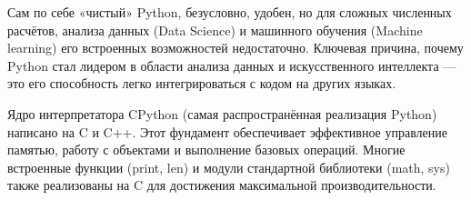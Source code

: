 \documentclass[pract]{SCWorks}
\begin{document}

\date{2026}

\maketitle

\secNumbering

\tableofcontents




\intro


Сам по себе «чистый» Python, безусловно, удобен, но для сложных численных расчётов, анализа данных (Data Science) и 
машинного обучения (Machine learning) его встроенных возможностей недостаточно. Ключевая причина, почему Python стал 
лидером в области анализа данных и искусственного интеллекта — это его способность легко интегрироваться 
с кодом на других языках.

Ядро интерпретатора CPython (самая распространённая реализация Python) написано на C и C++. Этот фундамент обеспечивает 
эффективное управление памятью, работу с объектами и выполнение базовых операций. 
Многие встроенные функции (print, len) и модули стандартной библиотеки (math, sys) также реализованы 
на C для достижения максимальной производительности.
\end{document}

